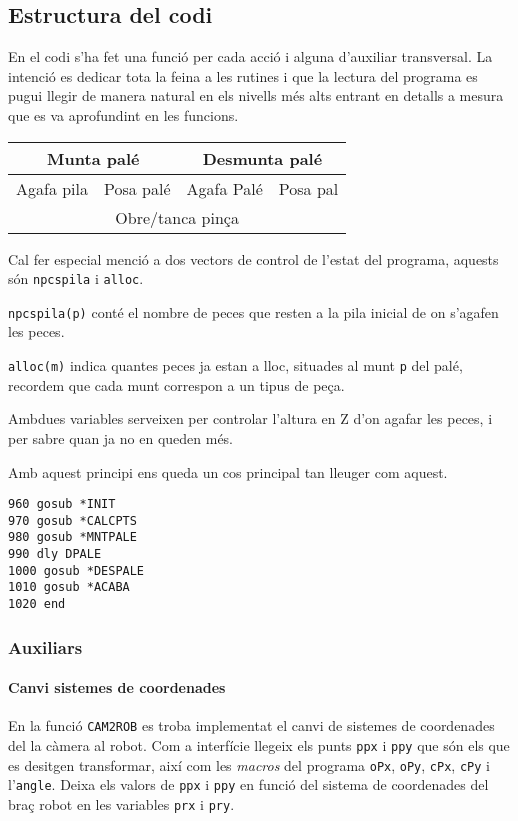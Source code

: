 \subsection{Estructura del codi}
En el codi s'ha fet una funció per cada acció i alguna d'auxiliar transversal.
La intenció es dedicar tota la feina a les rutines i que la lectura del
programa es pugui llegir de manera natural en els nivells més alts entrant en
detalls a mesura que es va aprofundint en les funcions.


\begin{center}
\begin{tabular}{|l|l|l|l|}
\hline
\multicolumn{2}{|c|}{Munta palé} & \multicolumn{2}{|c|}{Desmunta palé}\\
\hline
Agafa pila & Posa palé & Agafa Palé & Posa pal\\
\hline
\multicolumn{4}{|c|}{Obre/tanca pinça}\\
\hline
\end{tabular}
\end{center}


Cal fer especial menció a dos vectors de control de l'estat del programa,
aquests són \texttt{npcspila} i \texttt{alloc}.

\texttt{npcspila(p)} conté el nombre de peces que resten a la pila inicial de
on s'agafen les peces.

\texttt{alloc(m)} indica quantes peces ja estan a lloc, situades al munt
\texttt{p} del palé, recordem que cada munt correspon a un tipus de peça.

Ambdues variables serveixen per controlar l'altura en Z d'on agafar les
peces, i per sabre quan ja no en queden més.

Amb aquest principi ens queda un cos principal tan lleuger com aquest.
\begin{verbatim}
960 gosub *INIT
970 gosub *CALCPTS
980 gosub *MNTPALE
990 dly DPALE
1000 gosub *DESPALE
1010 gosub *ACABA
1020 end
\end{verbatim}

\subsubsection{Auxiliars}
\paragraph{Canvi sistemes de coordenades}\label{cam2rob}
En la funció \texttt{CAM2ROB} es troba implementat el canvi de sistemes
de coordenades del la càmera al robot.
Com a interfície llegeix els punts \texttt{ppx} i \texttt{ppy} que són els que es desitgen
transformar, així com les \emph{macros} del programa \texttt{oPx}, \texttt{oPy},
\texttt{cPx}, \texttt{cPy} i l'\texttt{angle}. Deixa els valors de
\texttt{ppx} i \texttt{ppy} en funció del sistema de coordenades del braç
robot en les variables \texttt{prx} i \texttt{pry}.

